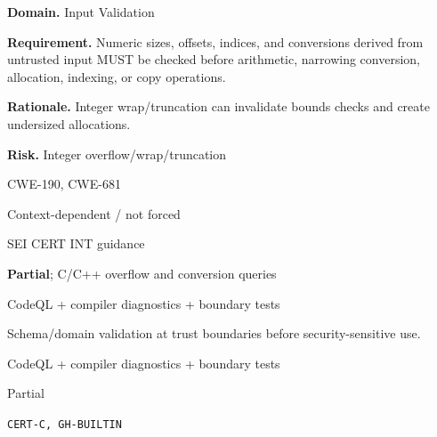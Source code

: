\documentclass[10pt,letterpaper]{article}
\newcommand{\prioritybadge}[2]{\tcbox[on line,boxrule=0pt,arc=1.2mm,boxsep=0.7mm,left=1mm,right=1mm,top=0.4mm,bottom=0.4mm,colback=#2!12,coltext=#2]{\scriptsize\bfseries #1}}
\begin{document}
\begin{rulebox}[title={\texttt{SCS-C-INPUT-001} \hfill \prioritybadge{High Priority}{High}}]
\textbf{Domain.} Input Validation

\textbf{Requirement.} Numeric sizes, offsets, indices, and conversions derived from untrusted input MUST be checked before arithmetic, narrowing conversion, allocation, indexing, or copy operations.

\textbf{Rationale.} Integer wrap/truncation can invalidate bounds checks and create undersized allocations.

\textbf{Risk.} Integer overflow/wrap/truncation

\begin{description}[leftmargin=2.65cm,labelwidth=2.3cm,style=nextline,itemsep=1pt,topsep=3pt]
  \item[CWE] CWE-190, CWE-681
  \item[OWASP] Context-dependent / not forced
  \item[CERT] SEI CERT INT guidance
  \item[CodeQL] \textbf{Partial}; C/C++ overflow and conversion queries
  \item[Enforcement] CodeQL + compiler diagnostics + boundary tests
  \item[Prevention] Schema/domain validation at trust boundaries before security-sensitive use.
  \item[Verification] CodeQL + compiler diagnostics + boundary tests
  \item[Automation] Partial
  \item[Sources] \texttt{CERT-C, GH-BUILTIN}
\end{description}
\end{rulebox}
\end{document}
